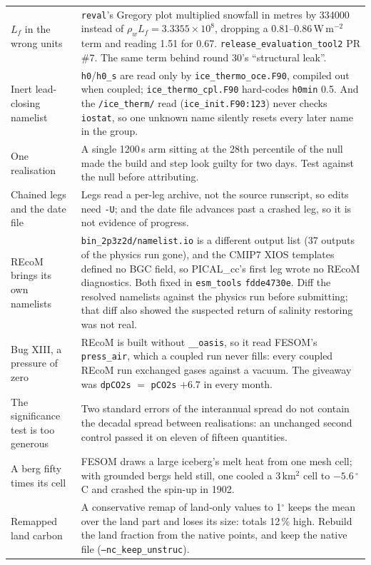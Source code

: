 \documentclass[10pt]{article}
\begin{document}
\begin{center}
\begin{tabular}{p{4.2cm}p{11.8cm}}
\addlinespace
$L_f$ in the wrong units &
\texttt{reval}'s Gregory plot multiplied snowfall in metres by 334000 instead of
$\rho_wL_f=3.3355\times10^8$, dropping a 0.81--0.86\,W\,m$^{-2}$ term and reading 1.51 for 0.67.
\texttt{release\_evaluation\_tool2} PR \#7. The same term behind round 30's ``structural leak''. \\
\addlinespace
Inert lead-closing namelist &
\texttt{h0}/\texttt{h0\_s} are read only by \texttt{ice\_thermo\_oce.F90}, compiled out when
coupled; \texttt{ice\_thermo\_cpl.F90} hard-codes \texttt{h0min} 0.5. And the
\texttt{/ice\_therm/} read (\texttt{ice\_init.F90:123}) never checks \texttt{iostat}, so one
unknown name silently resets every later name in the group. \\
\addlinespace
One realisation &
A single 1200\,s arm sitting at the 28th percentile of the null made the build and step look
guilty for two days. Test against the null before attributing. \\
\addlinespace
Chained legs and the date file &
Legs read a per-leg archive, not the source runscript, so edits need \texttt{-U}; and the
date file advances past a crashed leg, so it is not evidence of progress. \\
\addlinespace
REcoM brings its own namelists &
\texttt{bin\_2p3z2d/namelist.io} is a different output list (37 outputs of the physics run gone), and
the CMIP7 XIOS templates defined no BGC field, so PICAL\_cc's first leg wrote no REcoM diagnostics.
Both fixed in \texttt{esm\_tools} \texttt{fdde4730e}. Diff the resolved namelists against the physics
run before submitting; that diff also showed the suspected return of salinity restoring was not
real. \\
\addlinespace
Bug XIII, a pressure of zero &
REcoM is built without \texttt{\_\_oasis}, so it read FESOM's \texttt{press\_air}, which a coupled run
never fills: every coupled REcoM run exchanged gases against a vacuum. The giveaway was
\texttt{dpCO2s} $=$ \texttt{pCO2s} $+6.7$ in every month. \\
\addlinespace
The significance test is too generous &
Two standard errors of the interannual spread do not contain the decadal spread between realisations:
an unchanged second control passed it on eleven of fifteen quantities. \\
\addlinespace
A berg fifty times its cell &
FESOM draws a large iceberg's melt heat from one mesh cell; with grounded bergs held still, one cooled a
3\,km$^2$ cell to $-5.6\,^\circ$C and crashed the spin-up in 1902. \\
\addlinespace
Remapped land carbon &
A conservative remap of land-only values to 1$^\circ$ keeps the mean over the land part and loses its
size: totals 12\,\% high. Rebuild the land fraction from the native points, and keep the native file
(\texttt{--nc\_keep\_unstruc}). \\
\bottomrule
\end{tabular}
\end{center}
\end{document}
